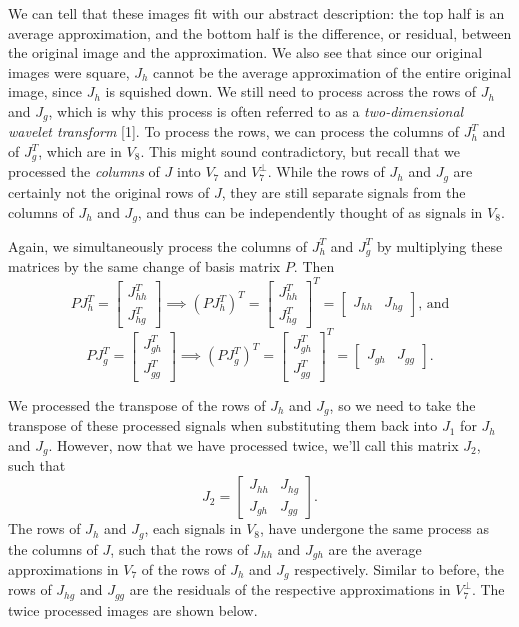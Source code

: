 \documentclass[11 pt]{article}
\begin{document}
We can tell that these images fit with our abstract description: the top half is an average approximation, and the bottom half is the difference, or residual, between the original image and the approximation. We also see that since our original images were square, $J_h$ cannot be the average approximation of the entire original image, since $J_h$ is squished down. We still need to process across the rows of $J_h$ and $J_g$, which is why this process is often referred to as a \emph{two-dimensional wavelet transform} [1]. To process the rows, we can process the columns of $J_h^T$ and of $J_g^T$, which are in $V_8$. This might sound contradictory, but recall that we processed the \emph{columns} of $J$ into $V_7$ and $V_7^\perp$. While the rows of $J_h$ and $J_g$ are certainly not the original rows of $J$, they are still separate signals from the columns of $J_h$ and $J_g$, and thus can be independently thought of as signals in $V_8$.

Again, we simultaneously process the columns of $J_h^T$ and $J_g^T$ by multiplying these matrices by the same change of basis matrix $P$. Then $$PJ_h^T=\begin{bmatrix}J_{hh}^T\\J_{hg}^T\end{bmatrix}\implies (PJ_h^T)^T=\begin{bmatrix}J_{hh}^T\\J_{hg}^T\end{bmatrix}^T=\begin{bmatrix}J_{hh} & J_{hg}\end{bmatrix}\text{, and}$$ $$PJ_g^T=\begin{bmatrix}J_{gh}^T\\J_{gg}^T\end{bmatrix}\implies (PJ_g^T)^T=\begin{bmatrix}J_{gh}^T\\J_{gg}^T\end{bmatrix}^T=\begin{bmatrix}J_{gh} & J_{gg}\end{bmatrix}.$$

We processed the transpose of the rows of $J_h$ and $J_g$, so we need to take the transpose of these processed signals when substituting them back into $J_1$ for $J_h$ and $J_g$. However, now that we have processed twice, we'll call this matrix $J_2$, such that $$J_2=\begin{bmatrix}J_{hh} & J_{hg}\\J_{gh} & J_{gg}\end{bmatrix}.$$ The rows of $J_h$ and $J_g$, each signals in $V_8$, have undergone the same process as the columns of $J$, such that the rows of $J_{hh}$ and $J_{gh}$ are the average approximations in $V_7$ of the rows of $J_h$ and $J_g$ respectively. Similar to before, the rows of $J_{hg}$ and $J_{gg}$ are the residuals of the respective approximations in $V_7^\perp$. The twice processed images are shown below.
\end{document}
